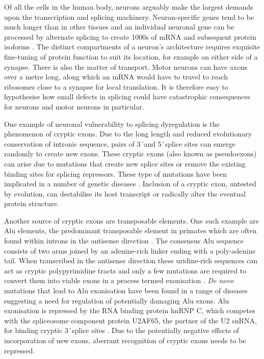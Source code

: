Of all the cells in the human body, neurons arguably make the largest demands upon the transcription and splicing machinery. Neuron-specific genes tend to be much longer than in other tissues \citep{Sibley2015} and an individual neuronal gene can be processed by alternate splicing to create 1000s of mRNA and subsequent protein isoforms \citep{Treutlein2014}. 
The distinct compartments of a neuron's architecture requires exquisite fine-tuning of protein function to suit its location, for example on either side of a synapse. 
There is also the matter of transport. 
Motor neurons can have axons over a metre long, along which an mRNA would have to travel to reach ribosomes close to a synapse for local translation. 
It is therefore easy to hypothesise how small defects in splicing could have catastrophic consequences for neurons and motor neurons in particular. 

One example of neuronal vulnerability to splicing dyregulation is the phenomenon of cryptic exons.
Due to the long length and reduced evolutionary conservation of intronic sequence, pairs of 3\'\ and 5\'\ splice sites can emerge randomly to create new exons. These cryptic exons (also known as pseudoexons) can arise due to mutations that create new splice sites or remove the existing binding sites for splicing repressors. These type of mutations have been implicated in a number of genetic diseases \citep{Eng2004-lq, Buratti2007-iz, Vorechovsky2006-wb,Meili2009-hc}. 
Inclusion of a cryptic exon, untested by evolution, can destabilise its host transcript or radically alter the eventual protein structure. 

Another source of cryptic exons are transposable elements. 
One such example are Alu elements, the predominant transposable element in primates which are often found within introns in the antisense direction \citep{Deininger2011-hc}. 
The consensus Alu sequence consists of two arms joined by an adenine-rich linker ending with a poly-adenine tail.  
When transcribed in the antisense direction these uridine-rich sequences can act as cryptic polypyrimidine tracts and only a few mutations are required to convert them into viable exons in a process termed exonisation \citep{Sorek2002-cm}.
\textit{De novo} mutations that lead to Alu exonisation have been found in a range of diseases \citep{Vorechovsky2010-or} suggesting a need for regulation of potentially damaging Alu exons. 
Alu exonisation is repressed by the RNA binding protein hnRNP C, which competes with the spliceosome component protein U2AF65, the partner of the U2 snRNA, for binding cryptic 3\'\ splice sites \citep{Zarnack2013-nv}. 
Due to the potentially negative effects of incorporation of new exons, aberrant recognition of cryptic exons needs to be repressed.

